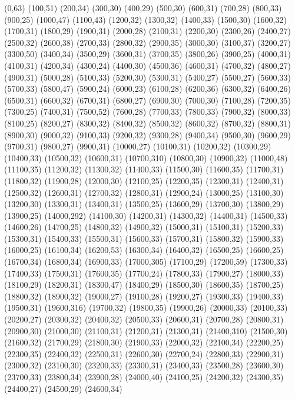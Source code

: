 (0,63)
(100,51)
(200,34)
(300,30)
(400,29)
(500,30)
(600,31)
(700,28)
(800,33)
(900,25)
(1000,47)
(1100,43)
(1200,32)
(1300,32)
(1400,33)
(1500,30)
(1600,32)
(1700,31)
(1800,29)
(1900,31)
(2000,28)
(2100,31)
(2200,30)
(2300,26)
(2400,27)
(2500,32)
(2600,38)
(2700,33)
(2800,32)
(2900,35)
(3000,30)
(3100,37)
(3200,27)
(3300,50)
(3400,34)
(3500,29)
(3600,31)
(3700,35)
(3800,26)
(3900,25)
(4000,31)
(4100,31)
(4200,34)
(4300,24)
(4400,30)
(4500,36)
(4600,31)
(4700,32)
(4800,27)
(4900,31)
(5000,28)
(5100,33)
(5200,30)
(5300,31)
(5400,27)
(5500,27)
(5600,33)
(5700,33)
(5800,47)
(5900,24)
(6000,23)
(6100,28)
(6200,36)
(6300,32)
(6400,26)
(6500,31)
(6600,32)
(6700,31)
(6800,27)
(6900,30)
(7000,30)
(7100,28)
(7200,35)
(7300,25)
(7400,31)
(7500,52)
(7600,28)
(7700,33)
(7800,33)
(7900,32)
(8000,33)
(8100,25)
(8200,27)
(8300,32)
(8400,32)
(8500,32)
(8600,32)
(8700,32)
(8800,31)
(8900,30)
(9000,32)
(9100,33)
(9200,32)
(9300,28)
(9400,34)
(9500,30)
(9600,29)
(9700,31)
(9800,27)
(9900,31)
(10000,27)
(10100,31)
(10200,32)
(10300,29)
(10400,33)
(10500,32)
(10600,31)
(10700,310)
(10800,30)
(10900,32)
(11000,48)
(11100,35)
(11200,32)
(11300,32)
(11400,33)
(11500,30)
(11600,35)
(11700,31)
(11800,32)
(11900,28)
(12000,30)
(12100,25)
(12200,35)
(12300,31)
(12400,31)
(12500,32)
(12600,31)
(12700,32)
(12800,31)
(12900,24)
(13000,25)
(13100,30)
(13200,30)
(13300,31)
(13400,31)
(13500,25)
(13600,29)
(13700,30)
(13800,29)
(13900,25)
(14000,292)
(14100,30)
(14200,31)
(14300,32)
(14400,31)
(14500,33)
(14600,26)
(14700,25)
(14800,32)
(14900,32)
(15000,31)
(15100,31)
(15200,33)
(15300,31)
(15400,33)
(15500,31)
(15600,33)
(15700,31)
(15800,32)
(15900,33)
(16000,25)
(16100,34)
(16200,53)
(16300,34)
(16400,32)
(16500,25)
(16600,25)
(16700,34)
(16800,34)
(16900,33)
(17000,305)
(17100,29)
(17200,59)
(17300,33)
(17400,33)
(17500,31)
(17600,35)
(17700,24)
(17800,33)
(17900,27)
(18000,33)
(18100,29)
(18200,31)
(18300,47)
(18400,29)
(18500,30)
(18600,35)
(18700,25)
(18800,32)
(18900,32)
(19000,27)
(19100,28)
(19200,27)
(19300,33)
(19400,33)
(19500,31)
(19600,316)
(19700,32)
(19800,35)
(19900,26)
(20000,33)
(20100,33)
(20200,27)
(20300,32)
(20400,32)
(20500,33)
(20600,31)
(20700,28)
(20800,31)
(20900,30)
(21000,30)
(21100,31)
(21200,31)
(21300,31)
(21400,310)
(21500,30)
(21600,32)
(21700,29)
(21800,30)
(21900,33)
(22000,32)
(22100,34)
(22200,25)
(22300,35)
(22400,32)
(22500,31)
(22600,30)
(22700,24)
(22800,33)
(22900,31)
(23000,32)
(23100,30)
(23200,33)
(23300,31)
(23400,33)
(23500,28)
(23600,30)
(23700,33)
(23800,34)
(23900,28)
(24000,40)
(24100,25)
(24200,32)
(24300,35)
(24400,27)
(24500,29)
(24600,34)
